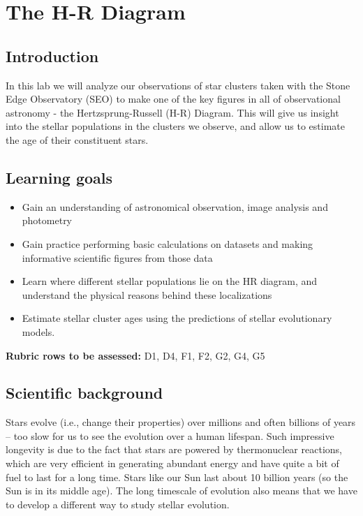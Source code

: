 \chapter{The H-R Diagram}


\section{Introduction}

In this lab we will analyze our observations of star clusters taken with the Stone Edge Observatory (SEO) to make one of the key figures in all of observational astronomy - the Hertzsprung-Russell (H-R) Diagram. This will give us insight into the stellar populations in the clusters we observe, and allow us to estimate the age of their constituent stars. 

\section{Learning goals}

\begin{itemize}
    \item Gain an understanding of astronomical observation, image analysis and photometry
	\item Gain practice performing basic calculations on datasets and making informative scientific figures from those data
	\item Learn where different stellar populations lie on the HR diagram, and understand the physical reasons behind these localizations
	\item Estimate stellar cluster ages using the predictions of stellar evolutionary models. 
\end{itemize}

\textbf{Rubric rows to be assessed:} D1, D4, F1, F2, G2, G4, G5

\section{Scientific background}

Stars evolve (i.e., change their properties) over millions and often billions of years – too slow for us to see the evolution over a human lifespan.  Such impressive longevity is due to the fact that stars are powered by thermonuclear reactions, which are very efficient in generating abundant energy and have quite a bit of fuel to last for a long time. Stars like our Sun last about 10 billion years (so the Sun is in its middle age). The long timescale of evolution also means that we have to develop a different way to study stellar evolution. 

